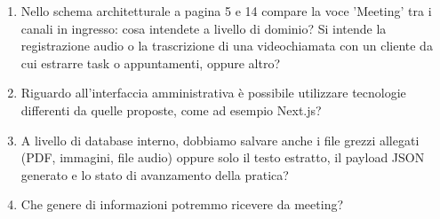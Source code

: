 \documentclass[11pt, a4paper]{article}
\begin{document}
\begin{enumerate}
	\item Nello schema architetturale a pagina 5 e 14 compare la voce 'Meeting' tra i canali in ingresso: cosa intendete a livello di dominio? Si intende la registrazione audio o la trascrizione di una videochiamata con un cliente da cui estrarre task o appuntamenti, oppure altro?
	\item Riguardo all’interfaccia amministrativa è possibile utilizzare tecnologie differenti da quelle proposte, come ad esempio Next.js?
	\item A livello di database interno, dobbiamo salvare anche i file grezzi allegati (PDF, immagini, file audio) oppure solo il testo estratto, il payload JSON generato e lo stato di avanzamento della pratica?
	\item Che genere di informazioni potremmo ricevere da meeting?
\end{enumerate}
\end{document}
